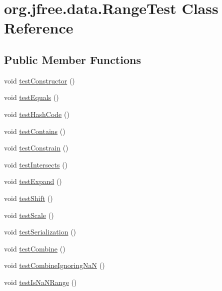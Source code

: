 \hypertarget{classorg_1_1jfree_1_1data_1_1_range_test}{}\section{org.\+jfree.\+data.\+Range\+Test Class Reference}
\label{classorg_1_1jfree_1_1data_1_1_range_test}
\subsection*{Public Member Functions}
\begin{DoxyCompactItemize}
\item 
void \mbox{\hyperlink{classorg_1_1jfree_1_1data_1_1_range_test_afae6d6d2c2c489dc4c9b1e2a47369b7c}{test\+Constructor}} ()
\item 
void \mbox{\hyperlink{classorg_1_1jfree_1_1data_1_1_range_test_a61ef83703bc304e023d89dfda54662c9}{test\+Equals}} ()
\item 
void \mbox{\hyperlink{classorg_1_1jfree_1_1data_1_1_range_test_afeb017eeac24ec146bffe7f8cee03563}{test\+Hash\+Code}} ()
\item 
void \mbox{\hyperlink{classorg_1_1jfree_1_1data_1_1_range_test_a4bf4f8ddde40d6cdaf48d8a072035646}{test\+Contains}} ()
\item 
void \mbox{\hyperlink{classorg_1_1jfree_1_1data_1_1_range_test_a8a2e6267670304736fb5ada8bd2f466a}{test\+Constrain}} ()
\item 
void \mbox{\hyperlink{classorg_1_1jfree_1_1data_1_1_range_test_a7bd76a21748f0cd0d0ef26dbe80f3926}{test\+Intersects}} ()
\item 
void \mbox{\hyperlink{classorg_1_1jfree_1_1data_1_1_range_test_aabda8d07caf497bdf874b96a3f016ce1}{test\+Expand}} ()
\item 
void \mbox{\hyperlink{classorg_1_1jfree_1_1data_1_1_range_test_a3b81cfbd94bf694c615089d83df019fd}{test\+Shift}} ()
\item 
void \mbox{\hyperlink{classorg_1_1jfree_1_1data_1_1_range_test_a04713e96e69d0d478950f57a6040d8b0}{test\+Scale}} ()
\item 
void \mbox{\hyperlink{classorg_1_1jfree_1_1data_1_1_range_test_ae3c9fe6b1647d38ea82f2f3c788b8c3e}{test\+Serialization}} ()
\item 
void \mbox{\hyperlink{classorg_1_1jfree_1_1data_1_1_range_test_ad30d10eeb24c3fb299c18e63af491b98}{test\+Combine}} ()
\item 
void \mbox{\hyperlink{classorg_1_1jfree_1_1data_1_1_range_test_a6adbe7da57825aa0072963b458dda2b2}{test\+Combine\+Ignoring\+NaN}} ()
\item 
void \mbox{\hyperlink{classorg_1_1jfree_1_1data_1_1_range_test_a4d61f68c89c6705041efdcf93b48dab5}{test\+Is\+Na\+N\+Range}} ()
\end{DoxyCompactItemize}


